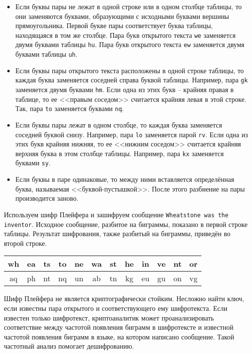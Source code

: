 \begin{itemize}
    \item Если буквы пары не лежат в одной строке или в одном столбце таблицы, то они заменяются буквами, образующими с исходными буквами вершины прямоугольника. Первой букве пары соответствует буква таблицы, находящаяся в том же столбце. Пара букв открытого текста \texttt{we} заменяется двумя буквами таблицы \texttt{hu}. Пара букв открытого текста \texttt{ew} заменяется двумя буквами таблицы \texttt{uh}.
    \item Если буквы пары открытого текста расположены в одной строке таблицы, то каждая буква заменяется соседней справа буквой таблицы. Например, пара \texttt{gk}  заменяется двумя буквами \texttt{hm}. Если одна из этих букв -- крайняя правая в таблице, то ее <<правым соседом>> считается крайняя левая в этой строке. Так, пара \texttt{to} заменяется буквами \texttt{nq}.
    \item Если буквы пары лежат в одном столбце, то каждая буква заменяется соседней буквой снизу. Например, пара \texttt{lo} заменяется парой \texttt{rv}. Если одна из этих букв крайняя нижняя, то ее <<нижним соседом>> считается крайняя верхняя буква в этом столбце таблицы. Например, пара \texttt{kx} заменяется буквами \texttt{sy}.
    \item Если буквы в паре одинаковые, то между ними вставляется определённая буква, называемая <<буквой-пустышкой>>. После этого разбиение на пары производится заново.
\end{itemize}

\example
Используем шифр Плейфера и зашифруем сообщение \texttt{Wheatstone was the inventor}. Исходное сообщение, разбитое на биграммы, показано в первой строке таблицы. Результат шифрования, также разбитый на биграммы, приведён во второй строке.
\begin{center} \begin{tabular}{|*{12}c|}
    \hline
    wh & ea & ts & to & ne & wa & st & he & in & ve & nt & or \\
    \hline
    aq & ph & nt & nq & un & ab & tn & kg & eu & gu & on & vg \\
    \hline
\end{tabular} \end{center}
\exampleend

Шифр Плейфера не является криптографически стойким. Несложно найти ключ, если известны пара открытого и соответствующего ему шифротекста. Если известен только шифротекст, криптоаналитик может проанализировать соответствие между частотой появления биграмм в шифротексте и известной частотой появления биграмм в языке, на котором написано сообщение. Такой частотный анализ помогает дешифрованию.
